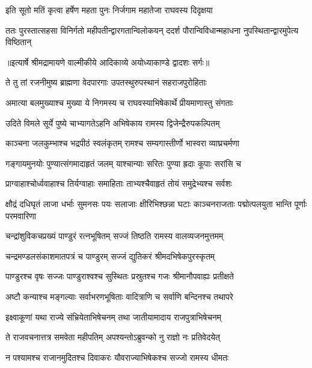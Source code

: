 \twolineshloka
{इति सूतो मतिं कृत्वा हर्षेण महता पुनः}
{निर्जगाम महातेजा राघवस्य दिदृक्षया} %

\fourlineindentedshloka
{ततः पुरस्तात्सहसा विनिर्गतो}
{ महीपतीन्द्वारगतान्विलोकयन्}
{ददर्श पौरान्विविधान्महाधना}
{नुपस्थितान्द्वारमुपेत्य विष्ठितान्} %


{॥इत्यार्षे श्रीमद्रामायणे वाल्मीकीये आदिकाव्ये अयोध्याकाण्डे द्वादशः सर्गः॥}


\twolineshloka
{ते तु तां रजनीमुष्य ब्राह्मणा वेदपारगाः}
{उपतस्थुरुपस्थानं सहराजपुरोहिताः} %

\twolineshloka
{अमात्या बलमुख्याश्च मुख्या ये निगमस्य च}
{राघवस्याभिषेकार्थे प्रीयमाणास्तु संगताः} %

\twolineshloka
{उदिते विमले सूर्ये पुष्ये चाभ्यागतेऽहनि}
{अभिषेकाय रामस्य द्विजेन्द्रैरुपकल्पितम्} %

\twolineshloka
{काञ्चना जलकुम्भाश्च भद्रपीठं स्वलंकृतम्}
{रामश्च सम्यगास्तीर्णो भास्वरा व्याघ्रचर्मणा} %

\twolineshloka
{गङ्गायमुनयोः पुण्यात्संगमादाहृतं जलम्}
{याश्चान्याः सरितः पुण्या ह्रदाः कूपाः सरांसि च} %

\twolineshloka
{प्राग्वाहाश्चोर्ध्ववाहाश्च तिर्यग्वाहाः समाहिताः}
{ताभ्यश्चैवाहृतं तोयं समुद्रेभ्यश्च सर्वशः} %

\threelineshloka
{क्षौद्रं दधिघृतं लाजा धर्भाः सुमनसः पयः}
{सलाजाः क्षीरिभिश्छन्ना घटाः काञ्चनराजताः}
{पद्मोत्पलयुता भान्ति पूर्णाः परमवारिणा} %

\twolineshloka
{चन्द्रांशुविकचप्रख्यं पाण्डुरं रत्नभूषितम्}
{सज्जं तिष्ठति रामस्य वालव्यजनमुत्तमम्} %

\twolineshloka
{चन्द्रमण्डलसंकाशमातपत्रं च पाण्डुरम्}
{सज्जं द्युतिकरं श्रीमदभिषेकपुरस्कृतम्} %

\twolineshloka
{पाण्डुरश्च वृषः सज्जः पाण्डुराश्वश्च सुस्थितः}
{प्रस्रुतश्च गजः श्रीमानौपवाह्यः प्रतीक्षते} %

\twolineshloka
{अष्टौ कन्याश्च मङ्गल्याः सर्वाभरणभूषिताः}
{वादित्राणि च सर्वाणि बन्दिनश्च तथापरे} %

\twolineshloka
{इक्ष्वाकूणां यथा राज्ये संभ्रियेताभिषेचनम्}
{तथा जातीयामादाय राजपुत्राभिषेचनम्} %

\twolineshloka
{ते राजवचनात्तत्र समवेता महीपतिम्}
{अपश्यन्तोऽब्रुवन्को नु राज्ञो नः प्रतिवेदयेत्} %

\twolineshloka
{न पश्यामश्च राजानमुदितश्च दिवाकरः}
{यौवराज्याभिषेकश्च सज्जो रामस्य धीमतः} %

